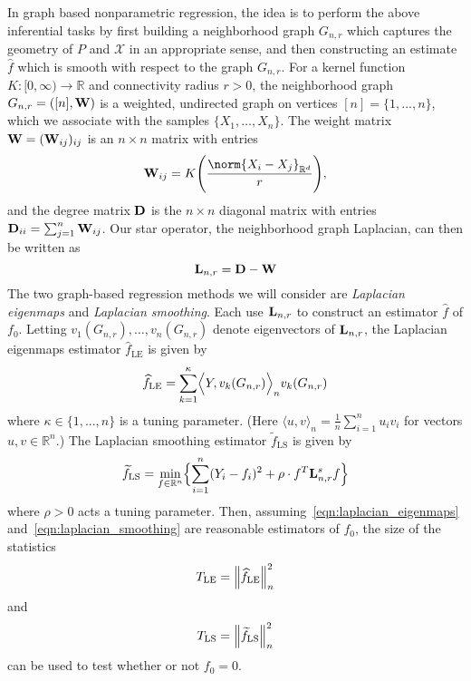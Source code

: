 \documentclass{article}
\newcommand{\Reals}{\mathbb{R}}
\newcommand{\1}{\mathbf{1}}
\newcommand{\Rd}{\Reals^d}
\newcommand{\Lap}{{\bf L}}
\newcommand{\mc}[1]{\mathcal{#1}}
\newcommand{\dotp}[2]{\langle #1, #2 \rangle}
\newcommand{\Dotp}[2]{\Bigl\langle #1, #2 \Bigr\rangle}
\newcommand{\wt}[1]{\widetilde{#1}}
\newcommand{\wh}[1]{\widehat{#1}}
\newcommand{\LE}{\mathrm{LE}}
\newcommand{\LS}{\mathrm{LS}}
\theoremstyle{alden}
\theoremstyle{aldenthm}
\theoremstyle{definition}
\theoremstyle{remark}
\begin{document}
In graph based nonparametric regression, the idea is to perform the above inferential tasks by first building a neighborhood graph $G_{n,r}$ which captures the geometry of $P$ and $\mc{X}$ in an appropriate sense, and then constructing an estimate $\wh{f}$ which is smooth with respect to the graph $G_{n,r}$. For a kernel function $K: [0,\infty) \to \Reals$ and connectivity radius $r > 0$, the neighborhood graph $G_{n,r} = ([n],{\bf W})$ is a weighted, undirected graph on vertices $[n] = \{1,...,n\}$, which we associate with the samples $\{X_1,\ldots,X_n\}$. The weight matrix ${\bf W} = ({\bf W}_{ij})_{ij}$ is an $n \times n$ matrix with entries
\begin{equation*}
\label{eqn:neighborhood_graph}
{\bf W}_{ij} = K\Biggl(\frac{\norm{X_i - X_j}_{\Rd}}{r}\Biggr),
\end{equation*}
and the degree matrix ${\bf D}$ is the $n \times n$ diagonal matrix with entries ${\bf D}_{ii} = \sum_{j = 1}^{n}{\bf W}_{ij}$.  Our star operator, the neighborhood graph Laplacian, can then be written as
\begin{equation}
\label{eqn:graph_Laplacian}
\Lap_{n,r} = \bf{D} - \bf{W}
\end{equation}
The two graph-based regression methods we will consider are \emph{Laplacian eigenmaps} and \emph{Laplacian smoothing}. Each use $\Lap_{n,r}$ to construct an estimator $\wh{f}$ of $f_0$. Letting $v_1(G_{n,r}),\ldots,v_n(G_{n,r})$ denote eigenvectors of $\Lap_{n,r}$, the Laplacian eigenmaps estimator $\wh{f}_{\LE}$ \citep{belkin2003} is given by 
\begin{equation}
\label{eqn:laplacian_eigenmaps}
\wh{f}_{\textrm{LE}} = \sum_{k = 1}^{\kappa} \Dotp{Y}{v_k(G_{n,r})}_n v_{k}(G_{n,r})
\end{equation}
where $\kappa \in \{1,...,n\}$ is a tuning parameter. (Here $\dotp{u}{v}_n = \frac{1}{n}\sum_{i = 1}^{n} u_i v_i$ for vectors $u,v \in \Reals^n$.) The Laplacian smoothing estimator $\wt{f}_{\LS}$ \citep{smola2003} is given by
\begin{equation}
\label{eqn:laplacian_smoothing}
\wt{f}_{\LS}= \min_{f \in \Reals^n} \Bigl\{\sum_{i = 1}^{n}(Y_i - f_i)^2 + \rho \cdot f^T \Lap_{n,r}^s f \Bigr\}
\end{equation}
where $\rho > 0$ acts a tuning parameter. Then, assuming~\eqref{eqn:laplacian_eigenmaps} and~\eqref{eqn:laplacian_smoothing} are reasonable estimators of $f_0$, the size of the statistics
\begin{equation}
T_{\LE} = \Bigl\|\wh{f}_{\LE}\Bigr\|_n^2 \label{eqn:laplacian_eigenmaps_test}
\end{equation}
and
\begin{equation}
T_{\LS} = \Bigl\|\wt{f}_{\LS}\Bigr\|_n^2 \label{eqn:laplacian_smoothing_test}
\end{equation}
can be used to test whether or not $f_0 = 0$.
\end{document}
